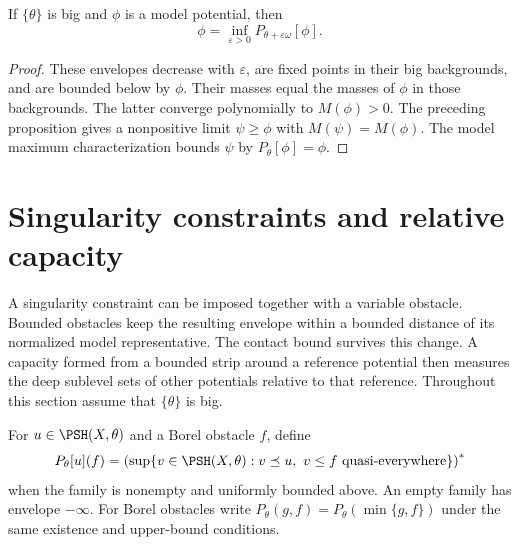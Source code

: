\begin{corollary}\label{cor:model-background-approximation}
If $\{\theta\}$ is big and $\phi$ is a model potential, then
\[
 \phi=\inf_{\varepsilon>0}P_{\theta+\varepsilon\omega}[\phi].
\]
\end{corollary}
\begin{proof}
These envelopes decrease with $\varepsilon$, are fixed points in their big backgrounds, and are bounded below by $\phi$. Their masses equal the masses of $\phi$ in those backgrounds. The latter converge polynomially to $M(\phi)>0$. The preceding proposition gives a nonpositive limit $\psi\geq\phi$ with $M(\psi)=M(\phi)$. The model maximum characterization bounds $\psi$ by $P_\theta[\phi]=\phi$.
\end{proof}

\section{Singularity constraints and relative capacity}
\label{sec:singularity-obstacles-relative-capacity}
A singularity constraint can be imposed together with a variable obstacle. Bounded obstacles keep the resulting envelope within a bounded distance of its normalized model representative. The contact bound survives this change. A capacity formed from a bounded strip around a reference potential then measures the deep sublevel sets of other potentials relative to that reference. Throughout this section assume that $\{\theta\}$ is big.

\begin{definition}\label{def:singularity-constrained-obstacle}
For $u\in\PSH(X,\theta)$ and a Borel obstacle $f$, define
\[
 P_\theta[u](f)=\left(\sup\{v\in\PSH(X,\theta):
             v\preceq u,\ v\leq f\text{ quasi-everywhere}\}\right)^*
\]
when the family is nonempty and uniformly bounded above. An empty family has envelope $-\infty$.
For Borel obstacles write $P_\theta(g,f)=P_\theta(\min\{g,f\})$ under the same existence and upper-bound conditions.
\end{definition}

